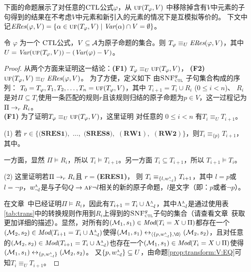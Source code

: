 下面的命题展示了对任意的$\textrm{CTL}$公式$\varphi$，从 $\textsc{uf}(T_\varphi,V)$ 中移除掉含有$V$中元素的子句得到的结果在不考虑$V$中元素和新引入的元素的情况下是互模拟等价的。
下文中记$\emph{ERes}(\varphi,V) = \{\alpha\in \textsc{uf}(T_\varphi,V)\mid \textit{Var}(\alpha)\cap V=\emptyset\}$。
\begin{proposition}\label{pro:resEQ}
	令 $\varphi$ 为一个 $\textrm{CTL}$公式，$V\subseteq\cal A$为原子命题的集合。则
	$T_\varphi \equiv_U\emph{ERes}(\varphi,V)$，其中  $U=\textit{Var}(\textsc{uf}(T_\varphi,V))-(\textit{Var}(\varphi)-  V)$。
\end{proposition}
\begin{proof}
	从两个方面来证明这一结论：\textbf{(F1)} $T_\varphi \equiv_U \textsc{uf}(T_\varphi,V)$， \textbf{(F2)} $\textsc{uf}(T_\varphi,V) \equiv_{U} \emph{ERes}(\varphi,V)$。
	为了方便，定义如下 由${\textsc{SNF}_{\textsc{ctl}}^g}$ 子句集合构成的序列： $T_0=T_{\varphi}, T_1, T_2, \dots, T_n = \textsc{uf}(T_\varphi,V)$，其中
	$T_{i+1} = T_i \cup R_i$ ($0\leq i < n$)、 $R_i$ 是对$\Pi \subseteq T_i$使用一条匹配的规则$r$且该规则归结的原子命题为$p\in V$，这一过程记为 $\Pi \rightarrow_r R_i$。
	\\
	
	\textbf{(F1)} 为了证明$T_\varphi \equiv_U \textsc{uf}(T_\varphi,V)$，这里证明 对任意的 $0\leq i < n$ 有$T_i \equiv_{U} T_{i+1}$。
	
	
	
	(1) 若 $r\in \{\textbf{(SRES1)},$ $\dots,$ $\textbf{(SRES8)},$ $(\textbf{RW1}),$ $(\textbf{RW2})\}$，则$T_i \equiv_{\{p\}} T_{i+1}$，其中。
	
	
	一方面，显然 $\Pi \models R_i$，所以 $T_i \models T_{i+1}$。另一方面 $T_i\subseteq T_{i+1}$，所以 $T_{i+1} \models T_i$。
	
	(2) 这里证明若$\Pi \rightarrow_r R_i$且 $r=$\textbf{(ERES1)}，
	则 $T_i \equiv_{\{l, w_{\neg l}^{\textsc{a}}\}} T_{i+1}$，其中 $l = p$或 $l = \neg p$，$w_{\neg l}^{\textsc{a}}$是与子句$Q \rightarrow \textsc{a} \textsc{f} \neg l$相关的新的原子命题，$l$是文字（即：$p$或者$\neg p$）。
	
	在文章~\cite{bolotov2000clausal}中已经证明$\Pi \models R_i$，因此有$T_{i+1}=T_i \cup \Lambda_{\neg l}^{\textsc{a}}$，其中$\Lambda_{\neg l}^{\textsc{a}}$是通过使用表\ref{tab:trans}中的转换规则作用到$R_i$上得到的${\textsc{SNF}_{\textsc{ctl}}^g}$子句的集合（请查看文章~\cite{zhang2009refined}获取更加详细的描述）。显然，对所有的$({\cal M}_1,s_1) \in \textit{Mod}(T_i= X \cup \Pi)$都存在一个$({\cal M}_2, s_2)\in \textit{Mod}(T_{i+1}=T_i \cup \Lambda_{\neg l}^{\textsc{a}})$使得$(\Hm_1, s_1) \lrto_{\tuple{\{p, w_{\neg l}^{\ALL}\}, {\O}}} (\Hm_2, s_2)$，且对任意的$({\cal M}_2, s_2)\in \textit{Mod}(T_{i+1}=T_i \cup \Lambda_{\neg l}^{\textsc{a}})$也存在一个$({\cal M}_1,s_1) \in \textit{Mod}(T_i= X \cup \Pi)$使得$({\cal M}_1, s_1) \leftrightarrow_{\{p, w_{\neg l}^{\textsc{a}}\}} ({\cal M}_2, s_2)$。
	又$\{p, w_{\neg l}^{\textsc{a}}\} \subseteq U$，由命题\ref{prop:transform:V:EQ}可知$T_i \equiv_{U} T_{i+1}$。
	

\end{proof}

